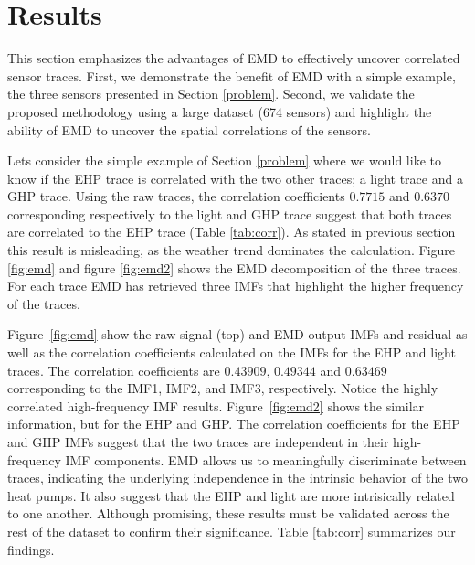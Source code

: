 \section{Results}




This section emphasizes the advantages of EMD to effectively uncover correlated sensor traces.
First, we demonstrate the benefit of EMD with a simple example, the three sensors presented in Section \ref{problem}.
Second, we validate the proposed methodology using a large dataset (674 sensors) and highlight the ability of EMD to uncover the spatial correlations of the sensors.

Lets consider the simple example of Section \ref{problem} where we would like to know if the EHP trace is correlated with the two other traces; a light trace and a GHP trace.
Using the raw traces, the correlation coefficients $0.7715$ and $0.6370$ corresponding respectively to the light and GHP trace suggest that both traces are correlated to the EHP trace (Table \ref{tab:corr}).
As stated in previous section this result is misleading, as the weather trend dominates the calculation.
Figure \ref{fig:emd} and figure \ref{fig:emd2} shows the EMD decomposition of the three traces.
For each trace EMD has retrieved three IMFs that highlight the higher frequency of the traces.

Figure~\ref{fig:emd} show the raw signal (top) and EMD output IMFs and residual as well as the 
correlation coefficients calculated on the IMFs for the EHP and
light traces.  The correlation coefficients are $0.43909$, $0.49344$ and $0.63469$ corresponding to the IMF1, 
IMF2, and IMF3, respectively.  Notice the highly correlated high-frequency IMF results.
Figure~\ref{fig:emd2} shows the similar information, but for the EHP and GHP.
The correlation coefficients for the EHP and GHP IMFs suggest that the two traces are independent in their 
high-frequency IMF components.
EMD allows us to meaningfully discriminate between traces, indicating the underlying independence in the intrinsic
behavior of the two heat pumps.  It also suggest that the EHP and light are more intrisically related
to one another.  Although promising, these results must be validated across the rest of the
dataset to confirm their significance.  Table \ref{tab:corr} summarizes our findings.

